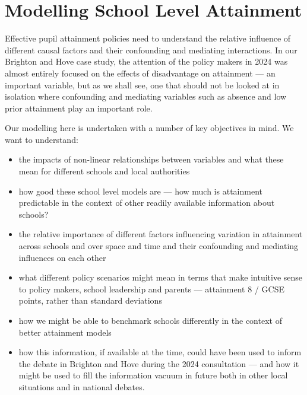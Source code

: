 \documentclass[
  11pt,
]{article}
\providecommand{\tightlist}{%
  \setlength{\itemsep}{0pt}\setlength{\parskip}{0pt}}
\begin{document}
\section{Modelling School Level
Attainment}\label{modelling-school-level-attainment}

Effective pupil attainment policies need to understand the relative
influence of different causal factors and their confounding and
mediating interactions. In our Brighton and Hove case study, the
attention of the policy makers in 2024 was almost entirely focused on
the effects of disadvantage on attainment --- an important variable, but
as we shall see, one that should not be looked at in isolation where
confounding and mediating variables such as absence and low prior
attainment play an important role.

Our modelling here is undertaken with a number of key objectives in
mind. We want to understand:

\begin{itemize}
\tightlist
\item
  the impacts of non-linear relationships between variables and what
  these mean for different schools and local authorities
\item
  how good these school level models are --- how much is attainment
  predictable in the context of other readily available information
  about schools?
\item
  the relative importance of different factors influencing variation in
  attainment across schools and over space and time and their
  confounding and mediating influences on each other
\item
  what different policy scenarios might mean in terms that make
  intuitive sense to policy makers, school leadership and parents ---
  attainment 8 / GCSE points, rather than standard deviations
\item
  how we might be able to benchmark schools differently in the context
  of better attainment models
\item
  how this information, if available at the time, could have been used
  to inform the debate in Brighton and Hove during the 2024 consultation
  --- and how it might be used to fill the information vacuum in future
  both in other local situations and in national debates.
\end{itemize}
\end{document}
